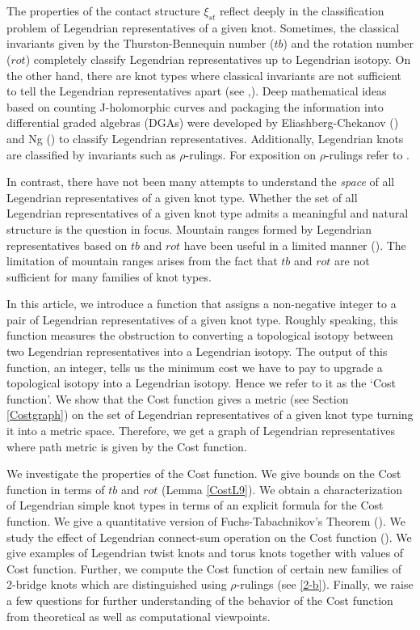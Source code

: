 \documentclass[11pt]{amsart}
\numberwithin{equation}{section}
\theoremstyle{plain}
\theoremstyle{definition}
\theoremstyle{remark} \newtheorem{remark}[equation]{Remark}
\theoremstyle{remark} \newtheorem{observation}[equation]{Observation}
\begin{document}
The properties of the contact structure $\xi_{st} $ reflect deeply in the classification problem of Legendrian representatives of a given knot. Sometimes, the classical invariants given by the Thurston-Bennequin number ($tb$) and the rotation number ($rot$) completely classify Legendrian representatives up to Legendrian isotopy.
On the other hand, there are knot types where classical invariants are not sufficient to tell the Legendrian representatives apart (see \cite{C1},\cite{C2}). Deep mathematical ideas based on counting J-holomorphic curves and packaging the information into differential graded algebras (DGAs) were developed by Eliashberg-Chekanov (\cite{EF}) and Ng (\cite{LNg}) to classify Legendrian representatives. Additionally, Legendrian knots are classified by invariants such as $\rho$-rulings. For exposition on $\rho$-rulings refer to \cite{E}.

In contrast, there have not been many attempts to understand the \emph{space} of all Legendrian representatives of a given knot type. Whether the set of all Legendrian representatives of a given knot type admits a meaningful and natural structure is the question in focus. Mountain ranges formed by Legendrian representatives based on $tb $ and $rot $ have been useful in a limited manner (\cite{E}). The limitation of mountain ranges arises from the fact that $tb$ and $rot$ are not sufficient for many families of knot types.

In this article, we introduce a function that assigns a non-negative integer to a pair of Legendrian representatives of a given knot type. Roughly speaking, this function measures the obstruction to converting a topological isotopy between two Legendrian representatives into a Legendrian isotopy. The output of this function, an integer, tells us the minimum cost we have to pay to upgrade a topological isotopy into a Legendrian isotopy. Hence we refer to it as the `Cost function'. We show that the Cost function gives a metric (see Section \ref{Costgraph}) on the set of Legendrian representatives of a given knot type turning it into a metric space. Therefore, we get a graph of Legendrian representatives where path metric is given by the Cost function.

We investigate the properties of the Cost function. We give bounds on the Cost function in terms of $tb$
and $rot$ (Lemma \ref{CostL9}). We obtain a characterization of Legendrian simple knot types in terms of an explicit formula for the Cost function. We give a quantitative version of Fuchs-Tabachnikov's Theorem (\cite{FT}). We study the effect of Legendrian connect-sum operation on the Cost function (\cite{C}). We give examples of Legendrian twist knots and torus knots together with values of Cost function. 
Further, we compute the Cost function of certain new families of 2-bridge knots which are distinguished using $\rho$-rulings (see \ref{2-b}). 
Finally, we raise a few questions for further understanding of the behavior of the Cost function from theoretical as well as computational viewpoints. \\
\end{document}
